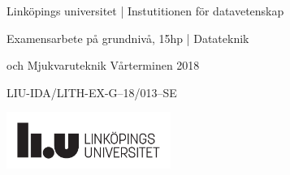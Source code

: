 \begin{titlepage}
	\vspace{10em}
\begin{minipage}{.85\linewidth}
\begin{center}Linköpings universitet | Instutitionen för datavetenskap\par%
Examensarbete på grundnivå, 15hp | Datateknik\par%
och Mjukvaruteknik Vårterminen 2018 \par
LIU-IDA/LITH-EX-G--18/013--SE

	\includegraphics[width=0.4\textwidth]{../Templates/liu_primary_black_sv.pdf}\\[2cm] %

\end{center}
\end{minipage}

	~

	\vfill\vfill



	\vfill %

\end{titlepage}


